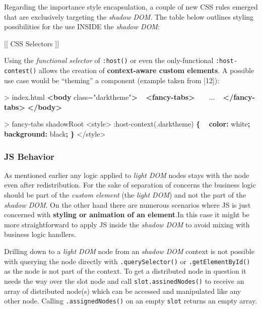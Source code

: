 \documentclass[]{assets/latex/ieee}
\newenvironment{Shaded}{}{}
\newcommand{\KeywordTok}[1]{\textcolor[rgb]{0.00,0.44,0.13}{\textbf{{#1}}}}
\newcommand{\DataTypeTok}[1]{\textcolor[rgb]{0.56,0.13,0.00}{{#1}}}
\newcommand{\DecValTok}[1]{\textcolor[rgb]{0.25,0.63,0.44}{{#1}}}
\newcommand{\FloatTok}[1]{\textcolor[rgb]{0.25,0.63,0.44}{{#1}}}
\newcommand{\StringTok}[1]{\textcolor[rgb]{0.25,0.44,0.63}{{#1}}}
\newcommand{\OtherTok}[1]{\textcolor[rgb]{0.00,0.44,0.13}{{#1}}}
\newcommand{\ErrorTok}[1]{\textcolor[rgb]{1.00,0.00,0.00}{\textbf{{#1}}}}
\newcommand{\NormalTok}[1]{{#1}}
\begin{document}
Regarding the importance style encapsulation, a couple of new CSS rules
emerged that are exclusively targeting the \emph{shadow DOM}. The table
below outlines styling possibilities for the use INSIDE the \emph{shadow
DOM}:

{[}{[} CSS Selectors {]}{]}

Using the \emph{functional selector} of \texttt{:host()} or even the
only-functional \texttt{:host-contest()} allows the creation of
\textbf{context-aware custom elements}. A possible use case would be
``theming'' a component (example taken from {[}12{]}):

\begin{Shaded}
\begin{Highlighting}[]
\NormalTok{> index.html}
\KeywordTok{<body}\OtherTok{ class=}\StringTok{"darktheme"}\KeywordTok{>}
  \KeywordTok{<fancy-tabs>}
    \NormalTok{...}
  \KeywordTok{</fancy-tabs>}
\KeywordTok{</body>}
\end{Highlighting}
\end{Shaded}

\begin{Shaded}
\begin{Highlighting}[]
\NormalTok{> fancy-tabs shadowRoot}
\NormalTok{<style>}
\DecValTok{:}\NormalTok{host-context(}\FloatTok{.darktheme}\NormalTok{) }\KeywordTok{\{}
\ErrorTok{ } \KeywordTok{color:} \DataTypeTok{white}\KeywordTok{;}
\ErrorTok{ } \KeywordTok{background:} \DataTypeTok{black}\KeywordTok{;}
\KeywordTok{\}}
\NormalTok{</style>}
\end{Highlighting}
\end{Shaded}

\subsubsection{JS Behavior}\label{js-behavior}

As mentioned earlier any logic applied to \emph{light DOM} nodes stays
with the node even after redistribution. For the sake of separation of
concerns the business logic should be part of the \emph{custom element}
(the \emph{light DOM}) and not the part of the \emph{shadow DOM}. On the
other hand there are numerous scenarios where JS is just concerned with
\textbf{styling or animation of an element}.In this case it might be
more straightforward to apply JS inside the \emph{shadow DOM} to avoid
mixing with business logic handlers.

Drilling down to a \emph{light DOM} node from an \emph{shadow DOM}
context is not possible with querying the node directly with
\texttt{.querySelector()} or \texttt{.getElementById()} as the node is
not part of the context. To get a distributed node in question it needs
the way over the slot node and call \texttt{slot.assinedNodes()} to
receive an array of distributed node(s) which can be accessed and
manipulated like any other node. Calling \texttt{.assignedNodes()} on an
empty \texttt{slot} returns an empty array.
\end{document}
